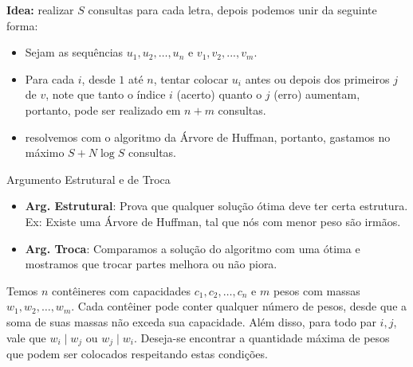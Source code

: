 \documentclass[12pt]{beamer}
\begin{document}
\begin{frame}
\begin{bloco}

\textbf{Idea:} realizar $S$ consultas para cada letra, depois podemos unir da seguinte forma:

\begin{itemize}
    \item Sejam as sequências $u_1, u_2, \dots, u_n$ e $v_1, v_2, ..., v_m$.
    \item Para cada $i$, desde $1$ até $n$, tentar colocar $u_i$ antes ou depois dos primeiros $j$ de $v$, note
    que tanto o índice $i$ (acerto) quanto o $j$ (erro) aumentam, portanto, pode ser realizado em $n + m$ consultas.
    \item resolvemos com o algoritmo da Árvore de Huffman, portanto, gastamos no máximo $S + N\log S$ consultas.
\end{itemize}

\end{bloco}
\end{frame}

\begin{frame}{Argumento Estrutural e de Troca}
\begin{definicao}
\begin{itemize}
    \item {\bfseries Arg. Estrutural}: Prova que qualquer solução ótima deve ter certa estrutura. Ex: Existe uma Árvore de Huffman, tal que nós com menor peso são irmãos.
    \item {\bfseries Arg. Troca}: Comparamos a solução do algoritmo com uma ótima e mostramos que trocar partes melhora ou não piora.
\end{itemize}
\end{definicao}
\end{frame}

\begin{frame}
\begin{bloco}[\textcolor{black}{POI 2007 Weights} (\href{https://szkopul.edu.pl/problemset/problem/h_QPStxSmfEHuL2h_I5Qpa29/site/?key=statement}{szkopul})]

Temos $n$ contêineres com capacidades $c_1, c_2, \dots, c_n$ e $m$ pesos com massas $w_1, w_2, \dots, w_m$. Cada contêiner pode conter qualquer número de pesos, desde que a soma de suas massas não exceda sua capacidade. Além disso, para todo par $i, j$, vale que $w_i \mid w_j$ ou $w_j \mid w_i$. Deseja-se encontrar a quantidade máxima de pesos que podem ser colocados respeitando estas condições.

\end{bloco}
\end{frame}
\end{document}
